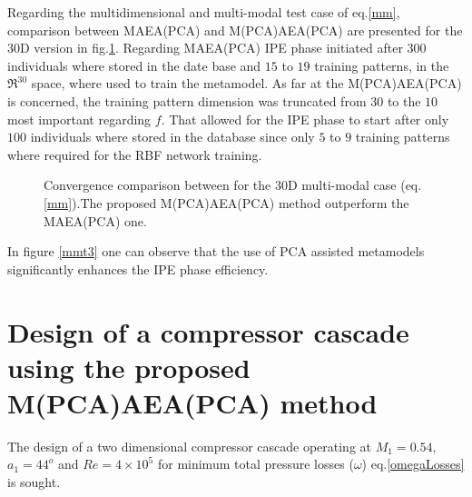Regarding the multidimensional and multi-modal test case of eq.\ref{mm}, comparison between MAEA(PCA) and M(PCA)AEA(PCA) are presented for the 30D version in fig.\ref{mmt3m}. Regarding MAEA(PCA)  IPE phase initiated after $300$ individuals where stored in the date base and $15$ to $19$ training patterns, in the $\Re^{30}$ space, where used to train the  metamodel. As far at the M(PCA)AEA(PCA) is concerned, the training pattern dimension was truncated from $30$ to the $10$ most important regarding $f$. That allowed for the  IPE phase to start after only $100$ individuals where stored in the database since only $5$ to $9$ training patterns where required for the RBF network training.

\begin{figure}[h!]
\begin{minipage}[b]{1\linewidth}
 \centering
\end{minipage}
\caption{Convergence comparison between for the 30D multi-modal case (eq. \ref{mm}).The proposed M(PCA)AEA(PCA) method outperform the MAEA(PCA) one.} 
\label{mmt3m}
\end{figure}

In figure \ref{mmt3} one can observe that the use of PCA assisted metamodels significantly enhances the IPE phase efficiency.


\section{Design of a compressor cascade using the proposed M(PCA)AEA(PCA) method}


The design of a two dimensional compressor cascade operating at $M_1=0.54$, $a_1=44^o$ and $Re=4\times10^5$ for minimum total pressure losses ($\omega$) eq.\ref{omegaLosses} is sought. 

